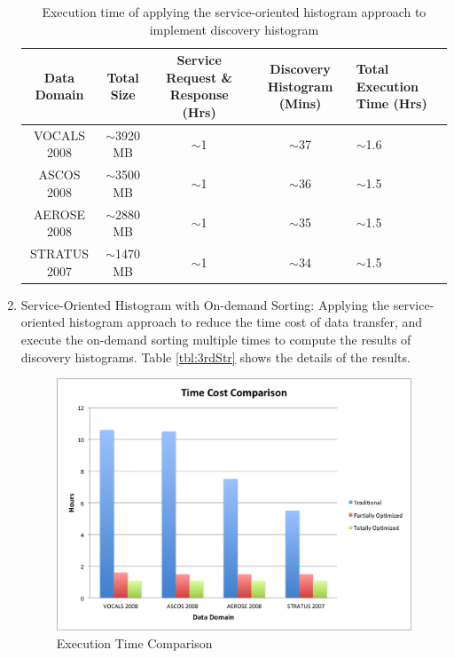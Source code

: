 \documentclass[times, 10pt,onecolumn]{article} %
\begin{document}
\begin{enumerate}
\begin{table}[!iht]
\centering
\begin{tabular}{|c|c|c|c|p{3cm}|}
\hline
\textbf{Data Domain} & \textbf{Total Size} & \textbf{ Service Request \& Response (Hrs)} & \textbf{Discovery Histogram (Mins) }& \textbf{Total Execution Time (Hrs) } \\ \hline
VOCALS 2008 &  $\sim$3920 MB & $\sim$1 & $\sim$37& $\sim$1.6\\ \hline
ASCOS 2008 & $\sim$3500 MB & $\sim$1 & $\sim$36& $\sim$1.5\\ \hline 
AEROSE 2008 & $\sim$2880 MB & $\sim$1 & $\sim$35&  $\sim$1.5 \\\hline 
STRATUS 2007 & $\sim$1470 MB & $\sim$1  & $\sim$34&  $\sim$1.5\\\hline
\end{tabular}
\caption{ Execution time of applying the service-oriented histogram approach to implement discovery histogram}
\label{tbl:2ndStr}
\end{table}

\item{Service-Oriented Histogram with On-demand Sorting:} Applying the service-oriented histogram approach to reduce the time cost of data transfer, and execute the on-demand sorting multiple times to compute the results of discovery histograms. Table \ref{tbl:3rdStr} shows the details of the results.

\begin{figure}[!iht]
\begin{center}
  \includegraphics[scale=0.6]{TimeComp.png}
  \caption{Execution Time Comparison}
  \label{fig:TCC}
\end{center}
\end{figure}


\end{enumerate}
\end{document}
